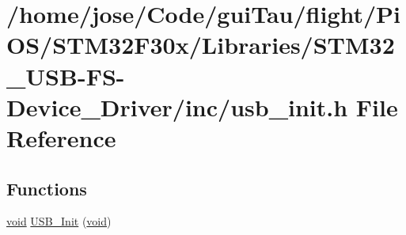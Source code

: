 \hypertarget{_s_t_m32_f30x_2_libraries_2_s_t_m32___u_s_b-_f_s-_device___driver_2inc_2usb__init_8h}{\section{/home/jose/\-Code/gui\-Tau/flight/\-Pi\-O\-S/\-S\-T\-M32\-F30x/\-Libraries/\-S\-T\-M32\-\_\-\-U\-S\-B-\/\-F\-S-\/\-Device\-\_\-\-Driver/inc/usb\-\_\-init.h File Reference}
\label{_s_t_m32_f30x_2_libraries_2_s_t_m32___u_s_b-_f_s-_device___driver_2inc_2usb__init_8h}
}
\subsection*{Functions}
\begin{DoxyCompactItemize}
\item 
\hyperlink{group___n_a_m_e_ga18028b8badbf1ea7e704ccac3c488e82}{void} \hyperlink{_s_t_m32_f30x_2_libraries_2_s_t_m32___u_s_b-_f_s-_device___driver_2inc_2usb__init_8h_a35fe971cbcbfe8813199e869284cb862}{U\-S\-B\-\_\-\-Init} (\hyperlink{group___n_a_m_e_ga18028b8badbf1ea7e704ccac3c488e82}{void})
\end{DoxyCompactItemize}
